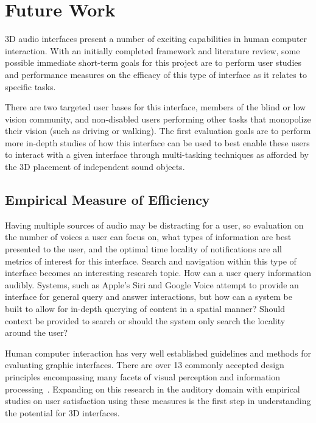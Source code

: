 \newpage                                                  \chapter{Future Work}

3D audio interfaces present a number of exciting capabilities in human computer
interaction. With an initially completed framework and literature review, some 
possible immediate short-term goals for this project are to perform user studies
and performance measures on the efficacy of this type of interface as it relates
to specific tasks.

There are two targeted user bases for this interface, members of the blind or low
vision community, and non-disabled users performing other tasks that monopolize 
their vision (such as driving or walking). The first evaluation goals are to 
perform more in-depth studies of how this interface can be used to best enable 
these users to interact with a given interface through multi-tasking techniques 
as afforded by the 3D placement of independent sound objects.

\section{                  Empirical Measure of Efficiency                    }

Having multiple sources of audio may be distracting for a user, so evaluation on
the number of voices a user can focus on, what types of information are best
presented to the user, and the optimal time locality of notifications are all 
metrics of interest for this interface. Search and navigation within this type
of interface becomes an interesting research topic.  How can a user query 
information audibly. Systems, such as Apple’s Siri and Google Voice attempt 
to provide an interface for general query and answer interactions, but how can
a system be built to allow for in-depth querying of content in a spatial manner?
Should context be provided to search or should the system only search the 
locality around the user?

Human computer interaction has very well established guidelines and methods for
evaluating graphic interfaces. There are over 13 commonly accepted design
principles encompassing many facets of visual perception and information
processing~\cite{wickens2004intro}. Expanding on this research in
the auditory domain with empirical studies on user satisfaction using these
measures is the first step in understanding the potential for 3D interfaces.

